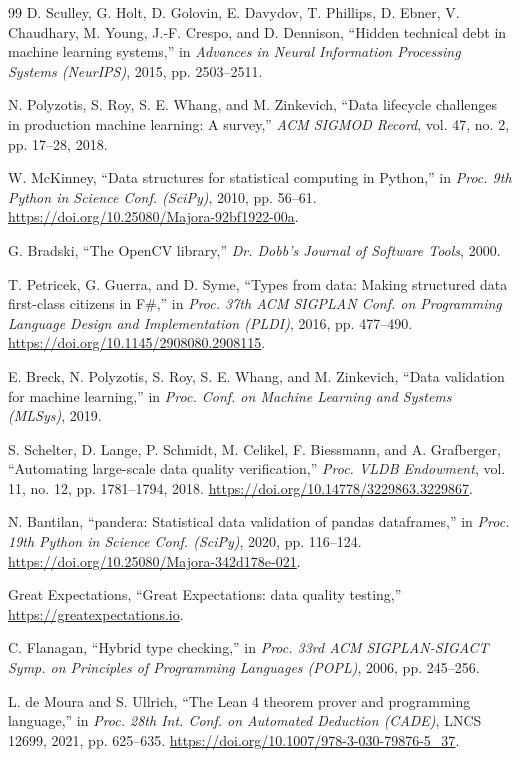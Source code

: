 \begin{thebibliography}{99}
\footnotesize
{}
D. Sculley, G. Holt, D. Golovin, E. Davydov, T. Phillips, D. Ebner, V. Chaudhary, M. Young, J.-F.
Crespo, and D. Dennison, ``Hidden technical debt in machine learning systems,'' in \emph{Advances
in Neural Information Processing Systems (NeurIPS)}, 2015, pp. 2503--2511.

N. Polyzotis, S. Roy, S. E. Whang, and M. Zinkevich, ``Data lifecycle challenges in production
machine learning: A survey,'' \emph{ACM SIGMOD Record}, vol. 47, no. 2, pp. 17--28, 2018.

W. McKinney, ``Data structures for statistical computing in Python,'' in \emph{Proc. 9th Python in
Science Conf. (SciPy)}, 2010, pp. 56--61. \url{https://doi.org/10.25080/Majora-92bf1922-00a}.

G. Bradski, ``The OpenCV library,'' \emph{Dr. Dobb's Journal of Software Tools}, 2000.

T. Petricek, G. Guerra, and D. Syme, ``Types from data: Making structured data first-class citizens
in F\#,'' in \emph{Proc. 37th ACM SIGPLAN Conf. on Programming Language Design and Implementation
(PLDI)}, 2016, pp. 477--490. \url{https://doi.org/10.1145/2908080.2908115}.

E. Breck, N. Polyzotis, S. Roy, S. E. Whang, and M. Zinkevich, ``Data validation for machine
learning,'' in \emph{Proc. Conf. on Machine Learning and Systems (MLSys)}, 2019.

S. Schelter, D. Lange, P. Schmidt, M. Celikel, F. Biessmann, and A. Grafberger, ``Automating
large-scale data quality verification,'' \emph{Proc. VLDB Endowment}, vol. 11, no. 12,
pp. 1781--1794, 2018. \url{https://doi.org/10.14778/3229863.3229867}.

N. Bantilan, ``pandera: Statistical data validation of pandas dataframes,'' in \emph{Proc. 19th
Python in Science Conf. (SciPy)}, 2020, pp. 116--124. \url{https://doi.org/10.25080/Majora-342d178e-021}.

Great Expectations, ``Great Expectations: data quality testing,'' \url{https://greatexpectations.io}.

C. Flanagan, ``Hybrid type checking,'' in \emph{Proc. 33rd ACM SIGPLAN-SIGACT Symp. on Principles
of Programming Languages (POPL)}, 2006, pp. 245--256.

L. de Moura and S. Ullrich, ``The Lean 4 theorem prover and programming language,'' in \emph{Proc.
28th Int. Conf. on Automated Deduction (CADE)}, LNCS 12699, 2021, pp. 625--635.
\url{https://doi.org/10.1007/978-3-030-79876-5_37}.


\end{thebibliography}
